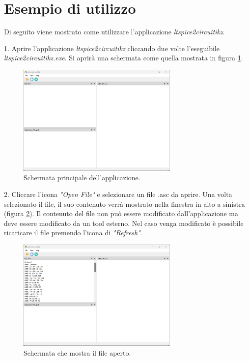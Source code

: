\clearpage

\section{Esempio di utilizzo}
Di seguito viene mostrato come utilizzare l'applicazione \textit{ltspice2circuitikz}. 

1. Aprire l'applicazione \textit{ltspice2circuitikz} cliccando due volte l'eseguibile \textit{ltspice2circuitikz.exe}. Si aprirà una schermata come quella mostrata in figura \ref{fig:punto_1}.


\begin{figure}[h!]
	\centering
	\includegraphics[width=0.7\textwidth]{./ImageFiles/mainview.png}
	\caption{Schermata principale dell'applicazione.}
	\label{fig:punto_1}
\end{figure}

2. Cliccare l'icona \textit{"Open File"} e selezionare un file .asc da aprire. Una volta selezionato il file, il suo contenuto verrà mostrato nella finestra in alto a sinistra (figura \ref{fig:punto_2}). Il contenuto del file non può essere modificato dall'applicazione ma deve essere modificato da un tool esterno. Nel caso venga modificato è possibile ricaricare il file premendo l'icona di \textit{"Refresh"}.
\begin{figure}[h!]
	\centering
	\includegraphics[width=0.7\textwidth]{./ImageFiles/file aperto.png}
	\caption{Schermata che mostra il file aperto.}
	\label{fig:punto_2}
\end{figure}

